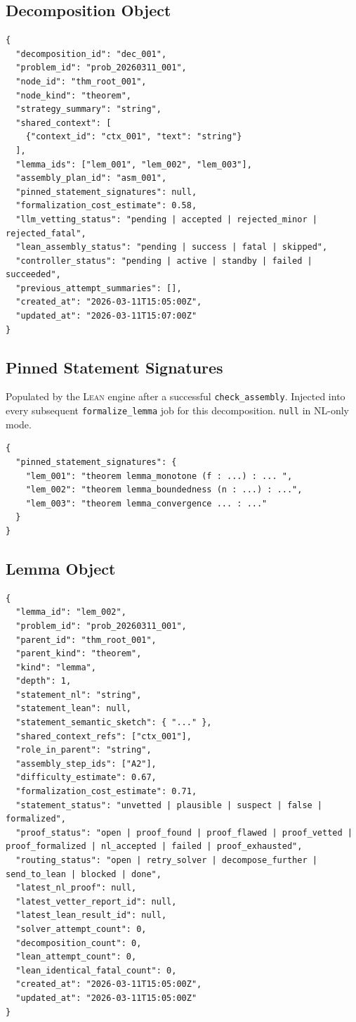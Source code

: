 \documentclass[11pt,a4paper]{article}
\newcommand{\Lean}{\textsc{Lean}}
\begin{document}
\subsection{Decomposition Object}

\begin{lstlisting}
{
  "decomposition_id": "dec_001",
  "problem_id": "prob_20260311_001",
  "node_id": "thm_root_001",
  "node_kind": "theorem",
  "strategy_summary": "string",
  "shared_context": [
    {"context_id": "ctx_001", "text": "string"}
  ],
  "lemma_ids": ["lem_001", "lem_002", "lem_003"],
  "assembly_plan_id": "asm_001",
  "pinned_statement_signatures": null,
  "formalization_cost_estimate": 0.58,
  "llm_vetting_status": "pending | accepted | rejected_minor | rejected_fatal",
  "lean_assembly_status": "pending | success | fatal | skipped",
  "controller_status": "pending | active | standby | failed | succeeded",
  "previous_attempt_summaries": [],
  "created_at": "2026-03-11T15:05:00Z",
  "updated_at": "2026-03-11T15:07:00Z"
}
\end{lstlisting}

\subsection{Pinned Statement Signatures}
Populated by the \Lean{} engine after a successful \texttt{check\_assembly}. Injected into every subsequent \texttt{formalize\_lemma} job for this decomposition. \texttt{null} in NL-only mode.

\begin{lstlisting}
{
  "pinned_statement_signatures": {
    "lem_001": "theorem lemma_monotone (f : ...) : ... ",
    "lem_002": "theorem lemma_boundedness (n : ...) : ...",
    "lem_003": "theorem lemma_convergence ... : ..."
  }
}
\end{lstlisting}

\subsection{Lemma Object}

\begin{lstlisting}
{
  "lemma_id": "lem_002",
  "problem_id": "prob_20260311_001",
  "parent_id": "thm_root_001",
  "parent_kind": "theorem",
  "kind": "lemma",
  "depth": 1,
  "statement_nl": "string",
  "statement_lean": null,
  "statement_semantic_sketch": { "..." },
  "shared_context_refs": ["ctx_001"],
  "role_in_parent": "string",
  "assembly_step_ids": ["A2"],
  "difficulty_estimate": 0.67,
  "formalization_cost_estimate": 0.71,
  "statement_status": "unvetted | plausible | suspect | false | formalized",
  "proof_status": "open | proof_found | proof_flawed | proof_vetted | proof_formalized | nl_accepted | failed | proof_exhausted",
  "routing_status": "open | retry_solver | decompose_further | send_to_lean | blocked | done",
  "latest_nl_proof": null,
  "latest_vetter_report_id": null,
  "latest_lean_result_id": null,
  "solver_attempt_count": 0,
  "decomposition_count": 0,
  "lean_attempt_count": 0,
  "lean_identical_fatal_count": 0,
  "created_at": "2026-03-11T15:05:00Z",
  "updated_at": "2026-03-11T15:05:00Z"
}
\end{lstlisting}
\end{document}
